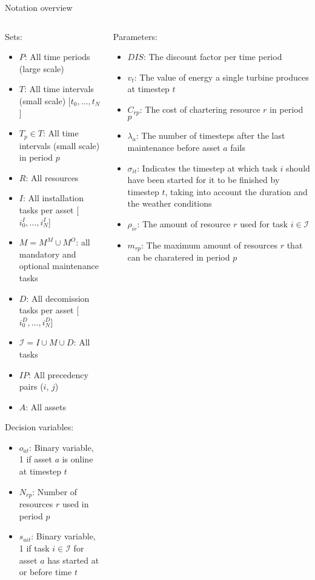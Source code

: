 \documentclass{beamer}
\begin{document}
\begin{frame}{Notation overview}
\tiny

\begin{columns}
\begin{column}{.48\textwidth}
Sets:
\begin{itemize}
\item $P$: All time periods (large scale)
\item $T$: All time intervals (small scale) [$t_0, \dots , t_N$]
\item $T_p \in T$: All time intervals (small scale) in period $p$
\item $R$: All resources
\item $I$: All installation tasks per asset [$i^I_0, \dots , i^I_N$]
\item $M = M^M \cup M^O$: all mandatory and optional maintenance tasks
\item $D$: All decomission tasks per asset [$i^D_0, \dots , i^D_N$]
\item $\mathcal{I} = I \cup M \cup D$: All tasks
\item $IP$: All precedency pairs ($i$, $j$)
\item $A$: All assets
\end{itemize}

Decision variables:
\begin{itemize}
\item $o_{at}$: Binary variable, 1 if asset $a$ is online at timestep $t$
\item $N_{rp}$: Number of resources $r$ used in period $p$
\item $s_{ait}$: Binary variable, 1 if task $i \in \mathcal{I}$ for asset $a$ has started at or before time $t$
\end{itemize}
\end{column}

\hfill

\begin{column}{.48\textwidth}
Parameters:
\begin{itemize}
\item $DIS$: The discount factor per time period
\item $v_t$: The value of energy a single turbine produces at timestep $t$
\item $C_{rp}$: The cost of chartering resource $r$ in period $p$
\item $\lambda_a$: The number of timesteps after the last maintenance before asset $a$ fails
\item $\sigma_{it}$: Indicates the timestep at which task $i$ should have been started for it to be finished by timestep $t$, taking into account the duration and the weather conditions
\item $\rho_{ir}$: The amount of resource $r$ used for task $i \in \mathcal{I}$
\item $m_{rp}$: The maximum amount of resources $r$ that can be charatered in period $p$
\end{itemize}
\end{column}
\end{columns}

\end{frame}
\end{document}
